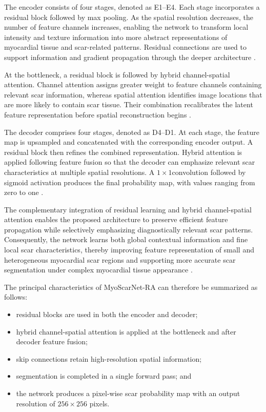 The encoder consists of four stages, denoted as E1--E4. Each stage incorporates a residual block followed by max pooling. As the spatial resolution decreases, the number of feature channels increases, enabling the network to transform local intensity and texture information into more abstract representations of myocardial tissue and scar-related patterns. Residual connections are used to support information and gradient propagation through the deeper architecture \citep{He2016}.

At the bottleneck, a residual block is followed by hybrid channel-spatial attention. Channel attention assigns greater weight to feature channels containing relevant scar information, whereas spatial attention identifies image locations that are more likely to contain scar tissue. Their combination recalibrates the latent feature representation before spatial reconstruction begins \citep{Hu2018,Woo2018}.

The decoder comprises four stages, denoted as D4--D1. At each stage, the feature map is upsampled and concatenated with the corresponding encoder output. A residual block then refines the combined representation. Hybrid attention is applied following feature fusion so that the decoder can emphasize relevant scar characteristics at multiple spatial resolutions. A \(1 \times 1\)convolution followed by sigmoid activation produces the final probability map, with values ranging from zero to one \citep{Riandini2026Access}.

The complementary integration of residual learning and hybrid channel-spatial attention enables the proposed architecture to preserve efficient feature propagation while selectively emphasizing diagnostically relevant scar patterns. Consequently, the network learns both global contextual information and fine local scar characteristics, thereby improving feature representation of small and heterogeneous myocardial scar regions and supporting more accurate scar segmentation under complex myocardial tissue appearance \citep{He2016,Hu2018,Woo2018}.

The principal characteristics of MyoScarNet-RA can therefore be summarized as follows:

\begin{itemize}[nosep, leftmargin=*]
	\item
	residual blocks are used in both the encoder and decoder;
	\item
	hybrid channel-spatial attention is applied at the bottleneck and after decoder feature fusion;
	\item
	skip connections retain high-resolution spatial information;
	\item
	segmentation is completed in a single forward pass; and
	\item
	the network produces a pixel-wise scar probability map with an output resolution of $256 \times 256$ pixels.
\end{itemize}

